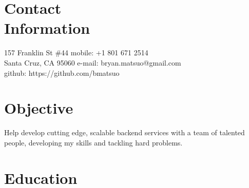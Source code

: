 \documentclass[margin,line]{resume}
\begin{document}
\begin{resume}

    \section{\mysidestyle Contact\\Information}

    157 Franklin St \#44            \hfill mobile: +1 801 671 2514         \vspace{0mm}\\\vspace{0mm}%
    Santa Cruz, CA 95060            \hfill e-mail: bryan.matsuo@gmail.com   \vspace{0mm}\\\vspace{-4.5mm}%
                                    \hfill github: https://github.com/bmatsuo   \vspace{0mm}\\\vspace{-4.5mm}%


    \section{\mysidestyle Objective}

    Help develop cutting edge, scalable backend services with a team of talented people, developing my skills and
    tackling hard problems.


    \section{\mysidestyle Education}


\end{resume}
\end{document}
